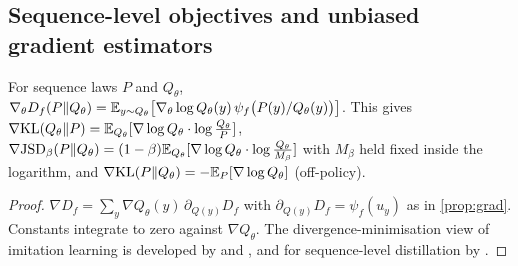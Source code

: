 \subsection{Sequence-level objectives and unbiased gradient estimators}

\begin{proposition}\label{prop:seq-grad}
\Pv\Ck For sequence laws $P$ and $Q_\theta$,
$\nabla_\theta D_f(P\|Q_\theta)=\mathbb{E}_{y\sim Q_\theta}\big[\nabla_\theta\log Q_\theta(y)\,\psi_f\big(P(y)/Q_\theta(y)\big)\big]$.
This gives
$\nabla\mathrm{KL}(Q_\theta\|P)=\mathbb{E}_{Q_\theta}[\nabla\log Q_\theta\cdot\log\frac{Q_\theta}P]$,
$\nabla\mathrm{JSD}_\beta(P\|Q_\theta)=(1-\beta)\mathbb{E}_{Q_\theta}[\nabla\log Q_\theta\cdot\log\frac{Q_\theta}{M_\beta}]$ with $M_\beta$
held fixed inside the logarithm, and $\nabla\mathrm{KL}(P\|Q_\theta)=-\mathbb{E}_P[\nabla\log Q_\theta]$ (off-policy).
\end{proposition}
\begin{proof}
$\nabla D_f=\sum_y\nabla Q_\theta(y)\,\partial_{Q(y)}D_f$ with $\partial_{Q(y)}D_f=\psi_f(u_y)$ as in \cref{prop:grad}.
Constants integrate to zero against $\nabla Q_\theta$. The divergence-minimisation view of imitation
learning is developed by \citet{ghasemipour2019divergence} and \citet{ke2020imitation}, and for sequence-level
distillation by \citet{wen2023fdivergence}.
\end{proof}

